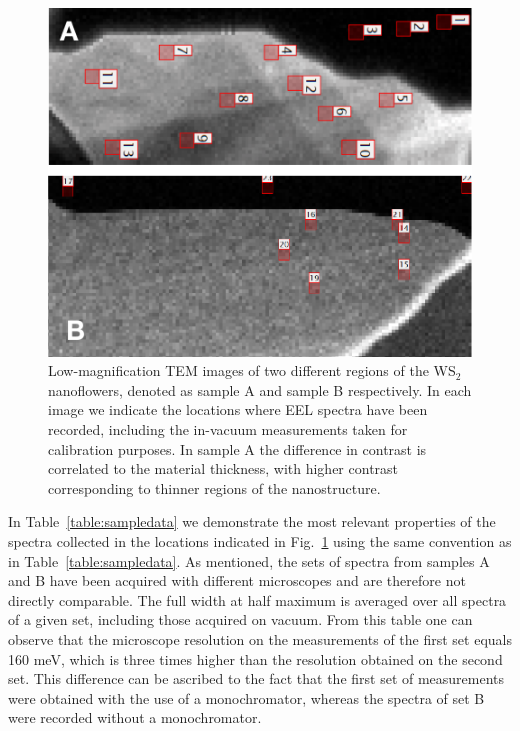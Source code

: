 \begin{figure}[t]
\begin{centering}
  \includegraphics[width=0.87\linewidth]{plots/Spectra_location.pdf}
  \caption{Low-magnification TEM images of two different regions of
    the WS$_2$ nanoflowers, denoted as sample A and sample B respectively.
    In each image we indicate the locations where
    EEL spectra have been recorded, including the in-vacuum measurements taken
    for calibration purposes.
    In sample A the difference in contrast is correlated to the material
    thickness, with higher contrast corresponding to thinner regions of the nanostructure.
  }
\label{fig:ws2positions}
\end{centering}
\end{figure}

In Table~\ref{table:sampledata} we demonstrate the most relevant properties of the spectra collected
in the locations indicated in Fig.~\ref{fig:ws2positions} using the same convention as
in Table~\ref{table:sampledata}.
%
As mentioned, the sets of spectra from samples A and B
have been acquired with different microscopes and are therefore
not directly comparable.
%
The full width at half maximum is averaged over all spectra of a given set,
including those acquired on vacuum.
%
From this table one can observe that the microscope resolution on the measurements of the first set equals 160 meV, 
which is three times higher
than the resolution obtained on the second set. 
%
This difference can be ascribed to the fact that the first set of measurements were obtained with the use of a 
monochromator, whereas the spectra of set B were recorded without a monochromator.
%

